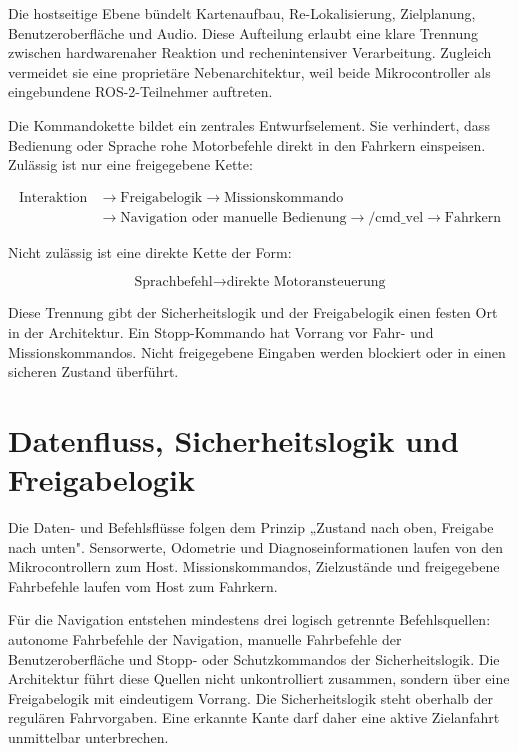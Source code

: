 Die hostseitige Ebene bündelt Kartenaufbau, Re-Lokalisierung, Zielplanung, Benutzeroberfläche und Audio. Diese Aufteilung erlaubt eine klare Trennung zwischen hardwarenaher Reaktion und rechenintensiver Verarbeitung. Zugleich vermeidet sie eine proprietäre Nebenarchitektur, weil beide Mikrocontroller als eingebundene ROS-2-Teilnehmer auftreten.

Die Kommandokette bildet ein zentrales Entwurfselement. Sie verhindert, dass Bedienung oder Sprache rohe Motorbefehle direkt in den Fahrkern einspeisen. Zulässig ist nur eine freigegebene Kette:

\begin{align*}
  \text{Interaktion} &\rightarrow \text{Freigabelogik} \rightarrow \text{Missionskommando} \\
                     &\rightarrow \text{Navigation oder manuelle Bedienung} \rightarrow \text{/cmd\_vel} \rightarrow \text{Fahrkern}
\end{align*}

Nicht zulässig ist eine direkte Kette der Form:

$$\text{Sprachbefehl} \rightarrow \text{direkte Motoransteuerung}$$

Diese Trennung gibt der Sicherheitslogik und der Freigabelogik einen festen Ort in der Architektur. Ein Stopp-Kommando hat Vorrang vor Fahr- und Missionskommandos. Nicht freigegebene Eingaben werden blockiert oder in einen sicheren Zustand überführt.

\section{Datenfluss, Sicherheitslogik und Freigabelogik}

Die Daten- und Befehlsflüsse folgen dem Prinzip „Zustand nach oben, Freigabe nach unten". Sensorwerte, Odometrie und Diagnoseinformationen laufen von den Mikrocontrollern zum Host. Missionskommandos, Zielzustände und freigegebene Fahrbefehle laufen vom Host zum Fahrkern.

Für die Navigation entstehen mindestens drei logisch getrennte Befehlsquellen: autonome Fahrbefehle der Navigation, manuelle Fahrbefehle der Benutzeroberfläche und Stopp- oder Schutzkommandos der Sicherheitslogik. Die Architektur führt diese Quellen nicht unkontrolliert zusammen, sondern über eine Freigabelogik mit eindeutigem Vorrang. Die Sicherheitslogik steht oberhalb der regulären Fahrvorgaben. Eine erkannte Kante darf daher eine aktive Zielanfahrt unmittelbar unterbrechen.

